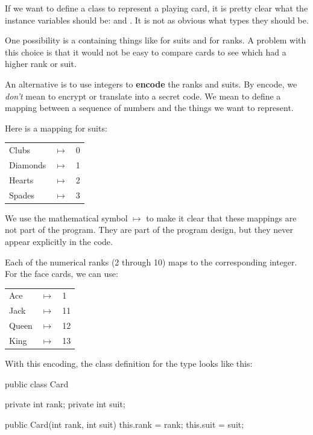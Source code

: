 If we want to define a class to represent a playing card, it is pretty clear what the instance variables should be:  and .
It is not as obvious what types they should be.

One possibility is a  containing things like  for suits and  for ranks.
A problem with this choice is that it would not be easy to compare cards to see which had a higher rank or suit.


An alternative is to use integers to {\bf encode} the ranks and suits.
By encode, we {\em don't} mean to encrypt or translate into a secret code.
We mean to define a mapping between a sequence of numbers and the things we want to represent.

Here is a mapping for suits:

\begin{tabular}{l c l}
Clubs & $\mapsto$ & 0 \\
Diamonds & $\mapsto$ & 1 \\
Hearts & $\mapsto$ & 2 \\
Spades & $\mapsto$ & 3
\end{tabular}


We use the mathematical symbol $\mapsto$ to make it clear that these mappings are not part of the program.
They are part of the program design, but they never appear explicitly in the code.

Each of the numerical ranks (2 through 10) maps to the corresponding integer.
For the face cards, we can use:

\begin{tabular}{l c l}
Ace & $\mapsto$ & 1 \\
Jack & $\mapsto$ & 11 \\
Queen & $\mapsto$ & 12 \\
King & $\mapsto$ & 13 \\
\end{tabular}

With this encoding, the class definition for the  type looks like this:

\begin{code}
public class Card {
    private int rank;
    private int suit;

    public Card(int rank, int suit) {
        this.rank = rank;
        this.suit = suit;
    }
}
\end{code}

